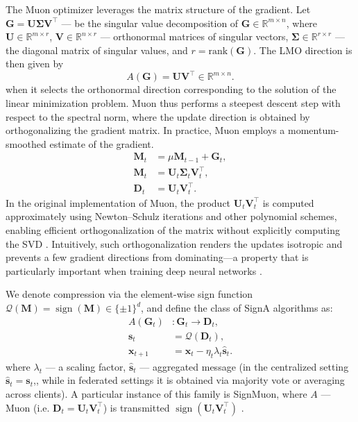 \documentclass{article}
\begin{document}
The Muon optimizer leverages the matrix structure of the gradient. Let $\mathbf{G}=\mathbf{U}\boldsymbol{\Sigma}\mathbf{V}^\top$ — be the singular value decomposition of $\mathbf{G}\in\mathbb{R}^{m\times n}$, where $\mathbf{U}\in\mathbb{R}^{m\times r}$, $\mathbf{V}\in\mathbb{R}^{n\times r}$ — orthonormal matrices of singular vectors, $\boldsymbol{\Sigma}\in\mathbb{R}^{r\times r}$ — the diagonal matrix of singular values, and $r=\mathrm{rank}(\mathbf{G})$. The LMO direction is then given by
\begin{equation}
A(\mathbf{G})=\mathbf{U}\mathbf{V}^\top \in \mathbb{R}^{m\times n}.
\end{equation}
when it selects the orthonormal direction corresponding to the solution of the linear minimization problem. Muon thus performs a steepest descent step with respect to the spectral norm, where the update direction is obtained by orthogonalizing the gradient matrix. In practice, Muon employs a momentum-smoothed estimate of the gradient.
\begin{equation}
    \begin{aligned}
        \mathbf{M}_t &= \mu \mathbf{M}_{t-1} + \mathbf{G}_t, \\
        \mathbf{M}_t &= \mathbf{U}_t \boldsymbol{\Sigma}_t \mathbf{V}_t^\top, \\
        \mathbf{D}_t &= \mathbf{U}_t \mathbf{V}_t^\top.
    \end{aligned}
\end{equation}
In the original implementation of Muon, the product $\mathbf{U}_t\mathbf{V}_t^\top$ is computed approximately using Newton–Schulz iterations and other polynomial schemes, enabling efficient orthogonalization of the matrix without explicitly computing the SVD \cite{amsel2025polarexpress, li2025convergence, liu2025muonscalable}. Intuitively, such orthogonalization renders the updates isotropic and prevents a few gradient directions from dominating—a property that is particularly important when training deep neural networks \cite{bernstein2024oldoptimizer, shah2025practical}.

We denote compression via the element-wise sign function $\mathcal{Q}(\mathbf{M})=\operatorname{sign}(\mathbf{M})\in\{\pm1\}^{d}$, and define the class of SignA algorithms as:
\begin{equation}
    \begin{aligned}
        A(\mathbf{G}_t) &: \mathbf{G}_t \to \mathbf{D}_t, \\
        \mathbf{s}_t &= \mathcal{Q}(\mathbf{D}_t), \\
        \mathbf{x}_{t+1} &= \mathbf{x}_t - \eta_t \lambda_t \hat{\mathbf{s}}_t.
    \end{aligned}
\end{equation}
where $\lambda_t$ — a scaling factor, $\hat{\mathbf{s}}_t$ — aggregated message (in the centralized setting $\hat{\mathbf{s}}_t=\mathbf{s}_t$,, while in federated settings it is obtained via majority vote or averaging across clients). A particular instance of this family is SignMuon, where $A$ — Muon (i.e. $\mathbf{D}_t=\mathbf{U}_t\mathbf{V}_t^\top$) is transmitted $\operatorname{sign}(\mathbf{U}_t\mathbf{V}_t^\top)$ \cite{petrov2025signmuon}.
\end{document}
